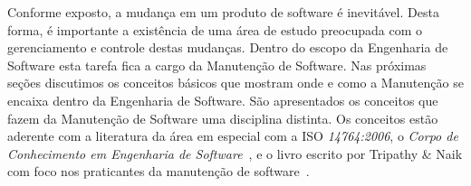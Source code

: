 Conforme exposto, a mudança em um produto de software é inevitável. Desta forma,
é importante a existência de uma área de estudo preocupada com o gerenciamento e
controle destas mudanças. Dentro do escopo da Engenharia de Software esta tarefa
fica a cargo da Manutenção de Software.  Nas próximas seções discutimos os
conceitos básicos que mostram onde e como a Manutenção se encaixa dentro da
Engenharia de Software. São apresentados os conceitos que fazem da Manutenção de
Software uma disciplina distinta.
Os conceitos estão aderente com a literatura da área em especial com a ISO
\textit{14764:2006}, o \textit{Corpo de Conhecimento em Engenharia de
	Software}~\cite{4425813}, e o livro escrito por Tripathy \& Naik com foco
nos praticantes da manutenção de software~\cite{tripathy2014software}.
\todoend
%
%

